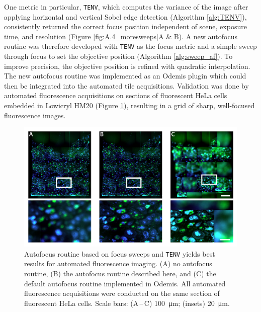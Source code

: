 One metric in particular, \texttt{TENV}, which computes the variance of the image after applying horizontal and vertical Sobel edge detection (Algorithm \ref{alg:TENV}), consistently returned the correct focus position independent of scene, exposure time, and resolution (Figure \ref{fig:A.4_moresweeps}A \& B). A new autofocus routine was therefore developed with \texttt{TENV} as the focus metric and a simple sweep through focus to set the objective position (Algorithm \ref{alg:sweep_af}). To improve precision, the objective position is refined with quadratic interpolation. The new autofocus routine was implemented as an Odemis plugin which could then be integrated into the automated tile acquisitions. Validation was done by automated fluorescence acquisitions on sections of fluorescent HeLa cells embedded in Lowicryl HM20 (Figure \ref{fig:A.5_sections}), resulting in a grid of sharp, well-focused fluorescence images.

\begin{figure}[!tb]
    \centering
    \includegraphics[width=\linewidth]{cppendix-A/figures/figA-5_sections.pdf}
    \caption{Autofocus routine based on focus sweeps and \texttt{TENV} yields best results for automated fluorescence imaging.
    (A) no autofocus routine, (B) the autofocus routine described here, and (C) the default autofocus routine implemented in Odemis.
    All automated fluorescence acquisitions were conducted on the same section of fluorescent HeLa cells.
    Scale bars: (A\,--\,C) \SI{100}{\micro\meter}; (insets) \SI{20}{\micro\meter}.}
    \label{fig:A.5_sections}
\end{figure}


